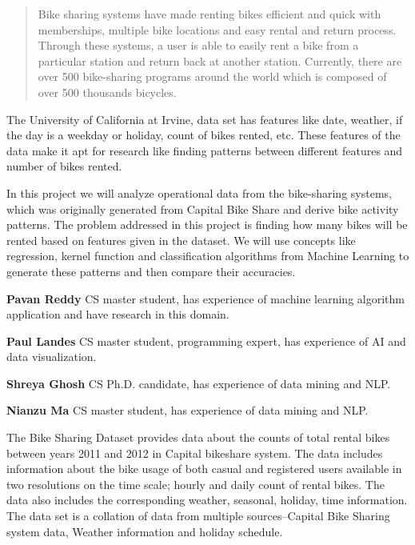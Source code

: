 \documentclass[12pt]{article}
\author{\theauthor}
\newcommand{\ci}[1]{\cite{#1}}
\begin{document}
\maketitle

\begin{abstract}
Bike sharing systems have made renting bikes efficient and quick with
memberships, multiple bike locations and easy rental and return
process. Through these systems, a user is able to easily rent a bike from a
particular station and return back at another station. Currently, there are
over 500 bike-sharing programs around the world which is composed of over 500
thousands bicycles\ci{ucibikeshare}.
\end{abstract}



The University of California at Irvine, data set has features like date,
weather, if the day is a weekday or holiday, count of bikes rented, etc. These
features of the data make it apt for research like finding patterns between
different features and number of bikes rented.

In this project we will analyze operational data from the bike-sharing systems,
which was originally generated from Capital Bike Share and derive bike activity
patterns. The problem addressed in this project is finding how many bikes will
be rented based on features given in the dataset. We will use concepts like
regression, kernel function and classification algorithms from Machine Learning
to generate these patterns and then compare their accuracies.

{\bf Pavan Reddy}
CS master student, has experience of machine learning algorithm application and
have research in this domain.

\noindent
{\bf Paul Landes} CS master student, programming expert, has experience of AI
and data visualization.

\noindent
{\bf Shreya Ghosh} CS Ph.D. candidate, has experience of data mining and NLP.

\noindent
{\bf Nianzu Ma} CS master student, has experience of data mining and NLP.



The Bike Sharing Dataset provides data about the counts of total rental bikes
between years 2011 and 2012 in Capital bikeshare system. The data includes
information about the bike usage of both casual and registered users available
in two resolutions on the time scale; hourly and daily count of rental
bikes. The data also includes the corresponding weather, seasonal, holiday,
time information. The data set is a collation of data from multiple
sources--Capital Bike Sharing system data\ci{capbikeshare}, Weather
information\ci{freemeteo} and holiday schedule\ci{holiday}.
\end{document}
